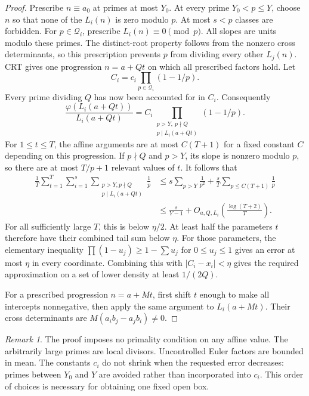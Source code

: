 \documentclass[11pt,a4paper]{article}
\theoremstyle{definition}\newtheorem{definition}[theorem]{Definition}
\theoremstyle{remark}\newtheorem{remark}[theorem]{Remark}
\newcommand{\ph}{\varphi}\newcommand{\rad}{\operatorname{rad}}
\begin{document}
\begin{proof}
Prescribe $n\equiv a_0$ at primes at most $Y_0$.
At every prime $Y_0<p\le Y$, choose $n$ so that none of the $L_i(n)$ is
zero modulo $p$. At most $s<p$ classes are forbidden.
For $p\in\mathcal Q_i$, prescribe $L_i(n)\equiv0\pmod p$.
All slopes are units modulo these primes. The distinct-root property follows
from the nonzero cross determinants, so this prescription prevents $p$ from
dividing every other $L_j(n)$.
CRT gives one progression $n=a+Qt$ on which all prescribed factors hold.
Let
\[
 C_i=c_i\prod_{p\in\mathcal Q_i}(1-1/p).
\]
Every prime dividing $Q$ has now been accounted for in $C_i$. Consequently
\[
 \frac{\ph(L_i(a+Qt))}{L_i(a+Qt)}
 =C_i\prod_{\substack{p>Y,\ p\nmid Q\\p\mid L_i(a+Qt)}}(1-1/p).
\]
For $1\le t\le T$, the affine arguments are at most $C(T+1)$ for a fixed
constant $C$ depending on this progression. If $p\nmid Q$ and $p>Y$, its
slope is nonzero modulo $p$, so there are at most $T/p+1$ relevant values of $t$.
It follows that
\begin{align*}
 \frac1T\sum_{t=1}^T\sum_{i=1}^s
 \sum_{\substack{p>Y,p\nmid Q\\p\mid L_i(a+Qt)}}\frac1p
 &\le s\sum_{p>Y}\frac1{p^2}
   +\frac{s}{T}\sum_{p\le C(T+1)}\frac1p\\
 &\le \frac{s}{Y-1}+O_{a,Q,L_i}\!\left(\frac{\log(T+2)}T\right).
\end{align*}
For all sufficiently large $T$, this is below $\eta/2$.
At least half the parameters $t$ therefore have their combined tail sum
below $\eta$. For those parameters, the elementary inequality
$\prod(1-u_j)\ge1-\sum u_j$ for $0\le u_j\le1$ gives an error at most
$\eta$ in every coordinate. Combining this with $|C_i-x_i|<\eta$ gives
the required approximation on a set of lower density at least $1/(2Q)$.

For a prescribed progression $n=a+Mt$, first shift $t$ enough to make all
intercepts nonnegative, then apply the same argument to $L_i(a+Mt)$.
Their cross determinants are $M(a_i b_j-a_j b_i)\ne0$.
\end{proof}

\begin{remark}
The proof imposes no primality condition on any affine value. The arbitrarily
large primes are local divisors. Uncontrolled Euler factors are bounded in mean.
The constants $c_i$ do not shrink when the requested error decreases: primes
between $Y_0$ and $Y$ are avoided rather than incorporated into $c_i$.
This order of choices is necessary for obtaining one fixed open box.
\end{remark}
\end{document}
